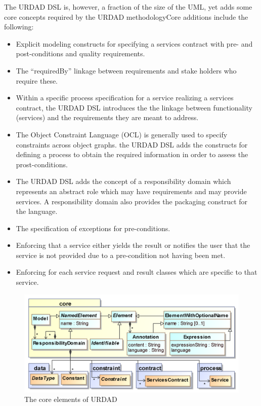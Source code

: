 The URDAD DSL is, however, a fraction of the size of the UML, yet adds some core concepts required by the URDAD methodologyCore additions include the following:
\begin{itemize}
  \item Explicit modeling constructs for specifying a services contract with pre- and post-conditions and quality requirements.
  \item The ``requiredBy'' linkage between requirements and stake holders who require these.
  \item Within a specific process specification for a service realizing a services contract, the URDAD DSL introduces the the linkage between functionality (services) and the requirements they are meant to address. 
  \item The Object Constraint Language (OCL) is generally used to specify constraints across object graphs. the URDAD DSL adds the constructs for defining a process to obtain the required information in order to assess the prost-conditions.
  \item The URDAD DSL adds the concept of a responsibility domain which represents an abstract role which may have requirements and may provide services. A responsibility domain also provides the packaging construct for the language.
  \item The specification of exceptions for pre-conditions.
  \item Enforcing that a service either yields the result or notifies the user that the service is not provided due to a pre-condition not having been met.
  \item Enforcing for each service request and result classes which are specific to that service.
\end{itemize}


\begin{figure}
  \centering
  \includegraphics{core}
  \caption{The core elements of URDAD}
  \label{fig:metamodel}
\end{figure}
         

